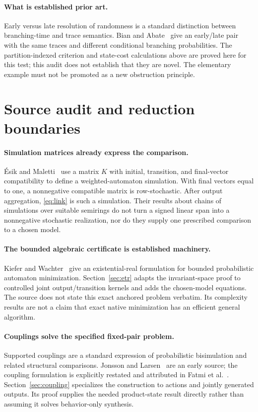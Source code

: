 \documentclass[11pt]{article}
\begin{document}
\paragraph{What is established prior art.}
Early versus late resolution of randomness is a standard distinction between branching-time and trace semantics. Bian and Abate~\cite[Figure 1]{BA2017} give an early/late pair with the same traces and different conditional branching probabilities. The partition-indexed criterion and state-cost calculations above are proved here for this test; this audit does not establish that they are novel. The elementary example must not be promoted as a new obstruction principle.

\section{Source audit and reduction boundaries}
\label{sec:audit}

\paragraph{Simulation matrices already express the comparison.}
\'Esik and Maletti~\cite[Definition 3.1]{EM2010} use a matrix $K$ with initial, transition, and final-vector compatibility to define a weighted-automaton simulation. With final vectors equal to one, a nonnegative compatible matrix is row-stochastic. After output aggregation, \eqref{eq:link} is such a simulation. Their results about chains of simulations over suitable semirings do not turn a signed linear span into a nonnegative stochastic realization, nor do they supply one prescribed comparison to a chosen model.

\paragraph{The bounded algebraic certificate is established machinery.}
Kiefer and Wachter~\cite[Proposition 10 and Theorem 11]{KW2014} give an existential-real formulation for bounded probabilistic automaton minimization. Section~\ref{sec:etr} adapts the invariant-space proof to controlled joint output/transition kernels and adds the chosen-model equations. The source does not state this exact anchored problem verbatim. Its complexity results are not a claim that exact native minimization has an efficient general algorithm.

\paragraph{Couplings solve the specified fixed-pair problem.}
Supported couplings are a standard expression of probabilistic bisimulation and related structural comparisons. Jonsson and Larsen~\cite{JL1991} are an early source; the coupling formulation is explicitly restated and attributed in Fatmi et al.~\cite[Definition 1]{FKPV2025}. Section~\ref{sec:coupling} specializes the construction to actions and jointly generated outputs. Its proof supplies the needed product-state result directly rather than assuming it solves behavior-only synthesis.
\end{document}
